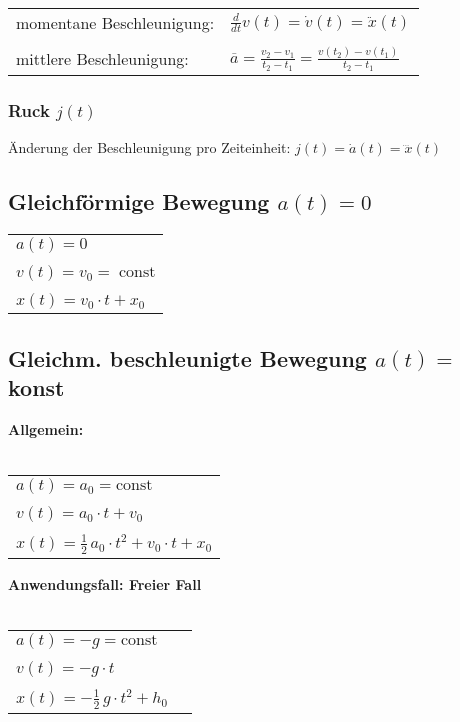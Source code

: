 			\begin{tabular}{ll}
				momentane Beschleunigung: & $\frac{d}{dt} v(t) = \dot{v}(t) = \ddot{x}(t)$ \\	
				\\
				mittlere Beschleunigung: & $\overline{a} = \frac{v_2 -v_1}{t_2 - t_1} =  \frac{v(t_2) - v(t_1)}{t_2 - t_1} $ \\
			\end{tabular}

		\subsubsection{Ruck $j(t)$}
		Änderung der Beschleunigung pro Zeiteinheit: $j(t) = \dot{a}(t) = \dddot{x}(t)$

	\subsection{Gleichförmige Bewegung $a(t) = 0$}
		\begin{tabular}{l}
			$a(t) = 0$ \\
			\\
			$v(t) = v_0 = \; \text{const}$ \\
			\\
			$x(t) = v_0 \cdot t + x_0 $ \\
		\end{tabular}
		
	\subsection{Gleichm. beschleunigte Bewegung $a(t) = $ konst}
		\begin{minipage}{0.48\linewidth}
			\textbf{Allgemein:} \\
				\\
				\begin{tabular}{l}
					$a(t) = a_0 = \text{const}$ \\
					\\
					$v(t) = a_0 \cdot t + v_0$ \\
					\\
					$x(t) = \frac{1}{2} \, a_0 \cdot t^2 + v_0 \cdot t + x_0$
				\end{tabular}
		\end{minipage}
		\hfill
		\begin{minipage}{0.48\linewidth}
			\textbf{Anwendungsfall: Freier Fall} \\
				\\
				\begin{tabular}{ll}
					$a(t) = -g = \text{const}$ \\
					\\
					$v(t) = -g \cdot t $ \\
					\\
					$x(t) = - \frac{1}{2} \, g \cdot t^2 + h_0$
				\end{tabular}
		\end{minipage}

